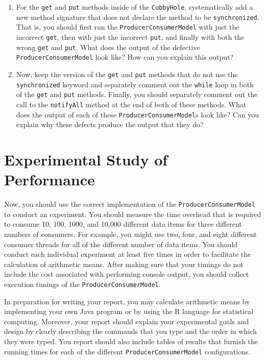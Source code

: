 \begin{enumerate}

  \item For the {\tt get} and {\tt put} methods inside of the {\tt CubbyHole}, systematically add a new method signature that does
    not declare the method to be {\tt synchronized}.  That is, you should first run the {\tt ProducerConsumerModel} with just the
    incorrect {\tt get}, then with just the incorrect {\tt put}, and finally with both the wrong {\tt get} and {\tt put}.   What
    does the output of the defective {\tt ProducerConsumerModel} look like?  How can you explain this output?  

  \item Now, keep the version of the {\tt get} and {\tt put} methods that do not use the {\tt synchronized} keyword and
    separately comment out the {\tt while} loop in both of the {\tt get} and {\tt put} methods.  Finally, you should separately
    comment out the call to the {\tt notifyAll} method at the end of both of these methods. What does the output of each of these
    {\tt ProducerConsumerModel}s look like? Can you explain why these defects produce the output that they do?

\end{enumerate}

\section*{Experimental Study of Performance}

  Now, you should use the correct implementation of the {\tt ProducerConsumerModel} to conduct an experiment.  You should
  measure the time overhead that is required to consume 10, 100, 1000, and 10,000 different data items for three different numbers
  of consumers.  For example, you might use two, four, and eight different consumer threads for all of the different number of
  data items.  You should conduct each individual experiment at least five times in order to facilitate the calculation of
  arithmetic means.  After making sure that your timings do not include the cost associated with performing console output, you
  should collect execution timings of the {\tt ProducerConsumerModel}.  

  In preparation for writing your report, you may calculate arithmetic means by implementing your own Java program or by using the
  R language for statistical computing.  Moreover, your report should explain your experimental goals and design by clearly
  describing the commands that you type and the order in which they were typed.  You report should also include tables of results
  that furnish the running times for each of the different {\tt ProducerConsumerModel} configurations.  
  
